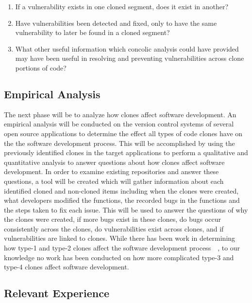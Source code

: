 \documentclass{article}
\begin{document}
\begin{enumerate} \itemsep1pt \parskip0pt 
 \item If a vulnerability exists in one cloned segment, does it exist in another? 
 \item Have vulnerabilities been detected and fixed, only to have the same vulnerability to later be found in a cloned segment? 
 \item What other useful information which concolic analysis could have provided may have been useful in resolving and preventing vulnerabilities across clone portions of code? 
\end{enumerate}



\subsection{Empirical Analysis}
The next phase will be to analyze how clones affect software development. An empirical analysis will be conducted on the version control systems of several open source applications to determine the effect all types of code clones have on the the software development process. This will be accomplished by using the previously identified clones in the target applications to perform a qualitative and quantitative analysis  to answer questions about how clones affect software development. In order to examine existing repositories and answer these questions, a tool will be created which will gather information about each identified cloned and non-cloned items including when the clones were created, what developers modified the functions, the recorded bugs in the functions and the steps taken to fix each issue. This will be used to answer the questions of why the clones were created, if more bugs exist in these clones, do bugs occur consistently across the clones, do vulnerabilities exist across clones, and if vulnerabilities are linked to clones. While there has been work in determining how type-1 and type-2 clones affect the software development process~\cite{Juergens:2009:CCM:1555001.1555062}~\cite{Jarzabek:2010:CHM:1808901.1808911}, to our knowledge no work has been conducted on how more complicated type-3 and type-4 clones affect software development.


\subsection{Relevant Experience}
\end{document}
